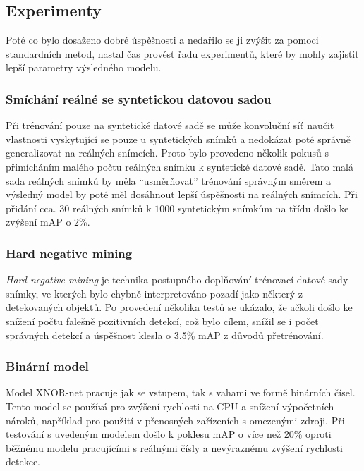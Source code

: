 \documentclass[czech]{ExcelAtFIT} %
\begin{document}
\subsection{Experimenty}
Poté co bylo dosaženo dobré úspěšnosti a nedařilo se ji zvýšit za pomoci standardních metod, nastal čas provést řadu experimentů, které by mohly zajistit lepší parametry výsledného modelu.

\subsubsection*{Smíchání reálné se syntetickou datovou sadou}
Při trénování pouze na syntetické datové sadě se může konvoluční síť naučit vlastnosti vyskytující se pouze u syntetických snímků a nedokázat poté správně generalizovat na reálných snímcích. Proto bylo provedeno několik pokusů s přimícháním malého počtu reálných snímku k syntetické datové sadě. Tato malá sada reálných snímků by měla ``usměrňovat'' trénování správným směrem a výsledný model by poté měl dosáhnout lepší úspěšnosti na reálných snímcích. Při přidání cca. $30$ reálných snímků k $1000$ syntetickým snímkům na třídu došlo ke zvýšení mAP o 2\%.

\subsubsection*{Hard negative mining}
\emph{Hard negative mining} je technika postupného doplňování trénovací datové sady snímky, ve kterých bylo chybně interpretováno pozadí jako některý z detekovaných objektů.
Po provedení několika testů se ukázalo, že ačkoli došlo ke snížení počtu falešně pozitivních detekcí, což bylo cílem, snížil se i počet správných detekcí a úspěšnost klesla o 3.5\% mAP z důvodů přetrénování.

\subsubsection*{Binární model}
Model XNOR-net pracuje jak se vstupem, tak s vahami ve formě binárních čísel. Tento model se používá pro zvýšení rychlosti na CPU a snížení výpočetních nároků, například pro použití v přenosných zařízeních s omezenými zdroji. Při testování s uvedeným modelem došlo k poklesu mAP o více než 20\% oproti běžnému modelu pracujícími s reálnými čísly a nevýraznému zvýšení rychlosti detekce.
\end{document}

